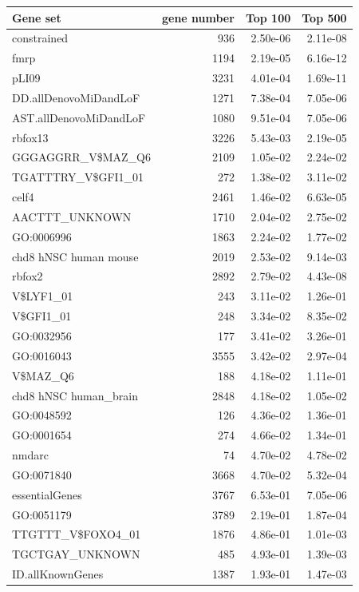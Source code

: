 \documentclass[]{article}
\begin{document}

\begin{table}[H]
\tiny
\begin{tabular}{|l|rrr|}
\hline
Gene set & gene number & Top 100 & Top 500 \\
\hline
constrained & 936 & 2.50e-06 & 2.11e-08\\
fmrp & 1194 & 2.19e-05 & 6.16e-12\\
pLI09 & 3231 & 4.01e-04 & 1.69e-11\\
DD.allDenovoMiDandLoF & 1271 & 7.38e-04 & 7.05e-06\\
AST.allDenovoMiDandLoF & 1080 & 9.51e-04 & 7.05e-06\\
rbfox13 & 3226 & 5.43e-03 & 2.19e-05\\
GGGAGGRR\_V\$MAZ\_Q6 & 2109 & 1.05e-02 & 2.24e-02\\
TGATTTRY\_V\$GFI1\_01 & 272 & 1.38e-02 & 3.11e-02\\
celf4 & 2461 & 1.46e-02 & 6.63e-05\\
AACTTT\_UNKNOWN & 1710 & 2.04e-02 & 2.75e-02\\
GO:0006996 & 1863 & 2.24e-02 & 1.77e-02\\
chd8 hNSC human mouse & 2019 & 2.53e-02 & 9.14e-03\\
rbfox2 & 2892 & 2.79e-02 & 4.43e-08\\
V\$LYF1\_01 & 243 & 3.11e-02 & 1.26e-01\\
V\$GFI1\_01 & 248 & 3.34e-02 & 8.35e-02\\
GO:0032956 & 177 & 3.41e-02 & 3.26e-01\\
GO:0016043 & 3555 & 3.42e-02 & 2.97e-04\\
V\$MAZ\_Q6 & 188 & 4.18e-02 & 1.11e-01\\
chd8 hNSC human\_brain & 2848 & 4.18e-02 & 1.05e-02\\
GO:0048592 & 126 & 4.36e-02 & 1.36e-01\\
GO:0001654 & 274 & 4.66e-02 & 1.34e-01\\
nmdarc & 74 & 4.70e-02 & 4.78e-02\\
GO:0071840 & 3668 & 4.70e-02 & 5.32e-04\\
essentialGenes & 3767 & 6.53e-01 & 7.05e-06\\
GO:0051179 & 3789 & 2.19e-01 & 1.87e-04\\
TTGTTT\_V\$FOXO4\_01 & 1876 & 4.86e-01 & 1.01e-03\\
TGCTGAY\_UNKNOWN & 485 & 4.93e-01 & 1.39e-03\\
ID.allKnownGenes & 1387 & 1.93e-01 & 1.47e-03\\

\end{tabular}
\end{table}
\end{document}
